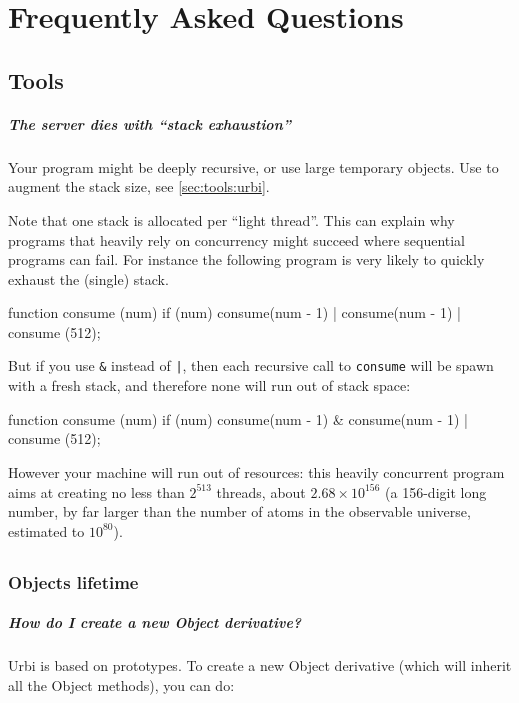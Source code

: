 \chapter{Frequently Asked Questions}
\label{sec:faq}

\section{Tools}
\paragraph{The server dies with ``stack exhaustion''}
Your program might be deeply recursive, or use large temporary
objects.  Use  to augment the stack size, see
\autoref{sec:tools:urbi}.

Note that one stack is allocated per ``light thread''.  This can
explain why programs that heavily rely on concurrency might succeed
where sequential programs can fail.  For instance the following
program is very likely to quickly exhaust the (single) stack.

\begin{urbifixme}
function consume (num)
{
  if (num)
    consume(num - 1) | consume(num - 1)
} |
consume (512);
\end{urbifixme}

But if you use \lstinline{&} instead of \lstinline{|}, then each
recursive call to \lstinline{consume} will be spawn with a fresh
stack, and therefore none will run out of stack space:

\begin{urbifixme}
function consume (num)
{
  if (num)
    consume(num - 1) & consume(num - 1)
} |
consume (512);
\end{urbifixme}

However your machine will run out of resources: this heavily
concurrent program aims at creating no less than $2^{513}$ threads,
about $2.68 \times 10^{156}$ (a 156-digit long number, by far larger
than the number of atoms in the observable universe, estimated to
$10^{80}$).

\section{\us}
\subsection{Objects lifetime}

\paragraph{How do I create a new Object derivative?}
Urbi is based on prototypes. To create a new Object derivative (which
will inherit all the Object methods), you can do:

